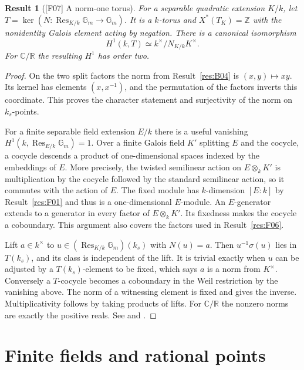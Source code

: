 \documentclass[11pt,a4paper,openany,oneside]{book}
\theoremstyle{resultstyle}
\newtheorem{statement}{Result}[chapter]
\newenvironment{result}[2]{\clubpenalty=10000\begin{statement}[\textnormal{[#1]} #2]\leavevmode\label{res:#1}\ignorespaces}{\end{statement}}
\theoremstyle{definition}
\numberwithin{equation}{chapter}
\newcommand{\Gm}{\mathbb{G}_m}
\DeclareMathOperator{\Res}{Res}
\newcommand{\ZZ}{\mathbb{Z}}
\newcommand{\RR}{\mathbb{R}}
\newcommand{\CC}{\mathbb{C}}
\begin{document}
\begin{result}{F07}{A norm-one torus}
For a separable quadratic extension $K/k$, let $T=\ker(N\colon\Res_{K/k}\Gm\to\Gm)$. It is a $k$-torus and $X^*(T_K)=\ZZ$ with the nonidentity Galois element acting by negation. There is a canonical isomorphism
\[
 H^1(k,T)\simeq k^\times/N_{K/k}K^\times.
\]
For $\CC/\RR$ the resulting $H^1$ has order two.
\end{result}
\begin{proof}
On the two split factors the norm from Result~\ref{res:B04} is $(x,y)\mapsto xy$. Its kernel has elements $(x,x^{-1})$, and the permutation of the factors inverts this coordinate. This proves the character statement and surjectivity of the norm on $k_s$-points.

For a finite separable field extension $E/k$ there is a useful vanishing $H^1(k,\Res_{E/k}\Gm)=1$. Over a finite Galois field $K'$ splitting $E$ and the cocycle, a cocycle descends a product of one-dimensional spaces indexed by the embeddings of $E$. More precisely, the twisted semilinear action on $E\otimes_k K'$ is multiplication by the cocycle followed by the standard semilinear action, so it commutes with the action of $E$. The fixed module has $k$-dimension $[E:k]$ by Result~\ref{res:F01} and thus is a one-dimensional $E$-module. An $E$-generator extends to a generator in every factor of $E\otimes_k K'$. Its fixedness makes the cocycle a coboundary. This argument also covers the factors used in Result~\ref{res:F06}.

Lift $a\in k^\times$ to $u\in(\Res_{K/k}\Gm)(k_s)$ with $N(u)=a$. Then $u^{-1}\sigma(u)$ lies in $T(k_s)$, and its class is independent of the lift. It is trivial exactly when $u$ can be adjusted by a $T(k_s)$-element to be fixed, which says $a$ is a norm from $K^\times$. Conversely a $T$-cocycle becomes a coboundary in the Weil restriction by the vanishing above. The norm of a witnessing element is fixed and gives the inverse. Multiplicativity follows by taking products of lifts. For $\CC/\RR$ the nonzero norms are exactly the positive reals. See \cite[Lemma 2.22 and Sec.~2.2.4]{prr} and \cite[Sec.~12.i]{milne}.
\end{proof}

\section{Finite fields and rational points}
\end{document}
